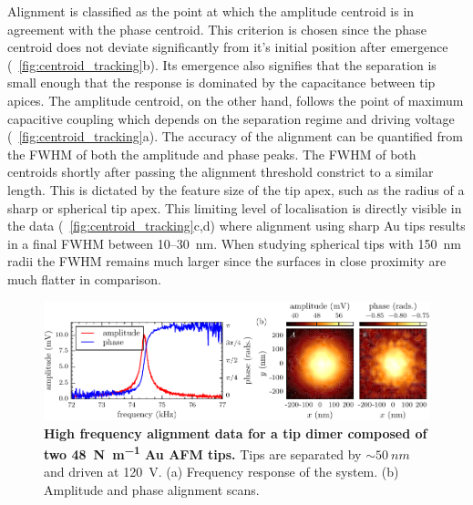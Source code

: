 \documentclass{article}
\begin{document}
Alignment is classified as the point at which the amplitude centroid is in agreement with the phase centroid. This criterion is chosen since the phase centroid does not deviate significantly from it's initial position after emergence (\figurename~\ref{fig:centroid_tracking}b). Its emergence also signifies that the separation is small enough that the response is dominated by the capacitance between tip apices. The amplitude centroid, on the other hand, follows the point of maximum capacitive coupling which depends on the separation regime and driving voltage (\figurename~\ref{fig:centroid_tracking}a). The accuracy of the alignment can be quantified from the FWHM of both the amplitude and phase peaks. The FWHM of both centroids shortly after passing the alignment threshold constrict to a similar length. This is dictated by the feature size of the tip apex, such as the radius of a sharp or spherical tip apex. This limiting level of localisation is directly visible in the data (\figurename~\ref{fig:centroid_tracking}c,d) where alignment using sharp Au tips results in a final FWHM between 10--\SI{30}{nm}. When studying spherical tips with \SI{150}{nm} radii the FWHM remains much larger since the surfaces in close proximity are much flatter in comparison. %

\begin{figure}[bt]
\centering
\includegraphics{figures/hf_alignment_data}
\caption[High frequency alignment data for a tip dimer composed of two \SI{48}{\newton\per\metre} Au AFM tips]{\textbf{High frequency alignment data for a tip dimer composed of two \SI{48}{\newton\per\metre} Au AFM tips.} Tips are separated by $\sim\SI{50}{nm}$ and driven at \SI{120}{V}. (a) Frequency response of the system. (b) Amplitude and phase alignment scans.}
\label{fig:hf_alignment_data} 
\end{figure}
\end{document}
